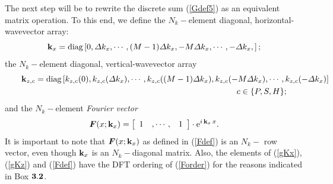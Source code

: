 The next step will be to rewrite the discrete sum (\ref{Gdef5}) as an 
equivalent matrix operation. To this end, we define the $N_k-$element 
diagonal, 
horizontal-wavevector array:
\begin{equation} \label{gKx}
{\bf  k}_{x} =\mbox{diag}\left[0,
{\mit \Delta} k_{x},\cdots, (M -1){\mit \Delta} k_{x},
-M {\mit \Delta} k_{x},\cdots,-{\mit \Delta} k_{x},\right];
\end{equation}
the $N_k-$element 
diagonal, 
vertical-wavevector array 
\begin{eqnarray} \label{gKz}
\lefteqn{{\bf  k}_{z,c} =\mbox{diag}\left[{ k}_{z,c}(0),{ k}_{z,c}({\mit \Delta} k_{x}),\cdots,
{ k}_{z,c}((M-1){\mit \Delta} k_{x}),
{ k}_{z,c}(-M{\mit \Delta} k_{x}),
\cdots, { k}_{z,c}(-{\mit \Delta} k_{x})\right]}\nonumber\\
&&\hspace{25em} c\in\{P,S,H\};
\end{eqnarray} 
and the $N_k-$element {\em Fourier vector\/}
\begin{equation} \label{Fdef}
{\mbox{\boldmath$\mit F$\unboldmath}}(x;{\bf k}_{x})=
\left[\begin{array}{ccc} 1&, \cdots, &1 \end{array}  
\right]\cdot{\rm e}^{i\, 
{\bf k}_{x}\,x}.
\end{equation} 
It is important to note that ${\mbox{\boldmath$\mit F$\unboldmath}}(x;{\bf k}_{x})$ as defined in 
(\ref{Fdef}) is an $N_k-$ row vector, even though ${\bf k}_{x}$ is an 
$N_k-$diagonal matrix. Also, the elements of (\ref{gKx}),
(\ref{gKz})  and (\ref{Fdef})  have the DFT 
ordering of (\ref{Forder}) for the reasons indicated in {\sc Box} 
$\bf 3.2$.


